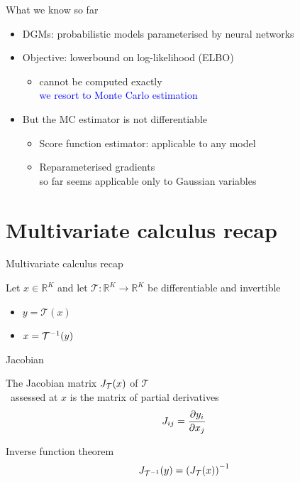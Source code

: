 

\begin{frame}{What we know so far}
    \begin{itemize}
        \item DGMs: \pause probabilistic models parameterised by neural networks \pause
        \item Objective: \pause lowerbound on log-likelihood (ELBO) \pause
        \begin{itemize}
        		\item \alert{cannot be computed exactly} \\ \pause
        		\textcolor{blue}{we resort to Monte Carlo estimation} \pause		
	\end{itemize}
	\item \alert{But the MC estimator is not differentiable} \pause		        
	\begin{itemize}
       		\item Score function estimator: applicable to any model  \pause
		\item Reparameterised gradients\\
		so far seems applicable only to Gaussian variables
        \end{itemize}
    \end{itemize}
    
\end{frame}

\frame{\tableofcontents}


\section{Multivariate calculus recap}

\begin{frame}{Multivariate calculus recap}

Let $x \in \mathbb R^K$ and let $\mathcal T: \mathbb R^K \to \mathbb R^K$ be differentiable and invertible
\begin{itemize}
	\item $y = \mathcal T(x)$
	\item $x = {\mathcal T}^{-1}(y)$
\end{itemize}

\end{frame}

\begin{frame}{Jacobian}

	The Jacobian matrix $J_{\mathcal T}(x) $ of  $\mathcal T$ \\
	~assessed at $x$ is the matrix of partial derivatives
	\begin{equation*}
		J_{ij} = \pdv{y_i}{x_j} 
	\end{equation*} 
	
	\pause
	Inverse function theorem
	\begin{equation*}
		J_{{\mathcal T}^{-1}}(y) = \left( J_{\mathcal T}(x) \right)^{-1}
	\end{equation*}
	
\end{frame}

